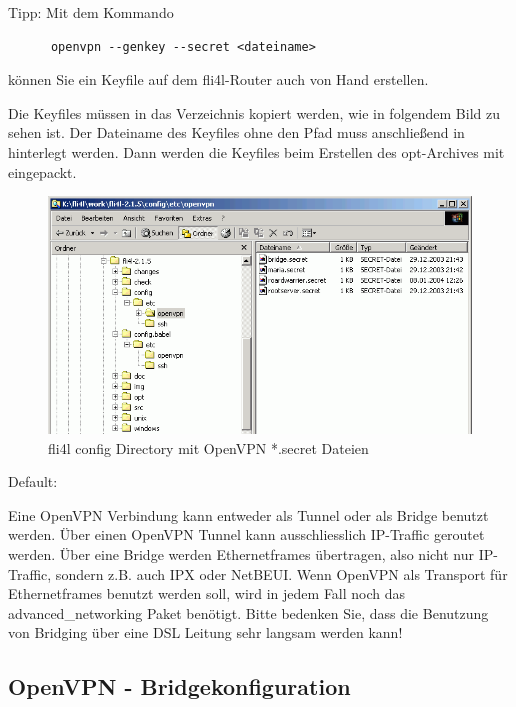 \begin{description}
  Tipp: Mit dem Kommando 
  \begin{verbatim}
      openvpn --genkey --secret <dateiname>
  \end{verbatim}
  können Sie ein Keyfile auf dem fli4l-Router auch von Hand erstellen.

  Die Keyfiles müssen in das Verzeichnis
   kopiert werden, wie in folgendem Bild
  zu sehen ist. Der Dateiname des Keyfiles ohne den Pfad muss
  anschließend in  hinterlegt werden. Dann
  werden die Keyfiles beim Erstellen des opt-Archives mit eingepackt.

  \begin{figure}[htbp]
    \centering
    \includegraphics[width=\columnwidth]{config_etc_openvpn}
    \caption{fli4l config Directory mit OpenVPN *.secret Dateien}
    \label{fig:config_etc_openvpn}
  \end{figure}


  Default: 

  Eine OpenVPN Verbindung kann entweder als Tunnel oder als Bridge
  benutzt werden. Über einen OpenVPN Tunnel kann ausschliesslich
  IP-Traffic geroutet werden. Über eine Bridge werden Ethernetframes
  übertragen, also nicht nur IP-Traffic, sondern z.B. auch IPX oder
  NetBEUI. Wenn OpenVPN als Transport für Ethernetframes benutzt werden
  soll, wird in jedem Fall noch das advanced\_networking Paket
  benötigt. Bitte bedenken Sie, dass die Benutzung von Bridging über
  eine DSL Leitung sehr langsam werden kann!

\end{description}

\subsection{OpenVPN - Bridgekonfiguration}

